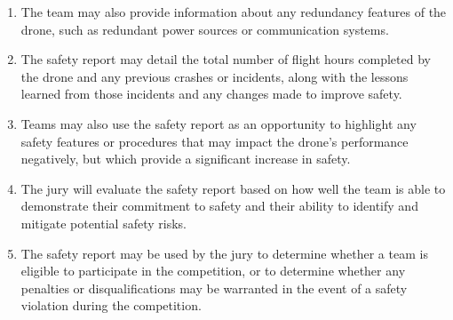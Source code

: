 \begin{enumerate}
    \item The team may also provide information about any redundancy features of the drone, such as redundant power sources or communication systems.
    \item The safety report may detail the total number of flight hours completed by the drone and any previous crashes or incidents, along with the lessons learned from those incidents and any changes made to improve safety.
    \item Teams may also use the safety report as an opportunity to highlight any safety features or procedures that may impact the drone's performance negatively, but which provide a significant increase in safety.
    \item The jury will evaluate the safety report based on how well the team is able to demonstrate their commitment to safety and their ability to identify and mitigate potential safety risks.
    \item The safety report may be used by the jury to determine whether a team is eligible to participate in the competition, or to determine whether any penalties or disqualifications may be warranted in the event of a safety violation during the competition.
    \end{enumerate}
    

  




